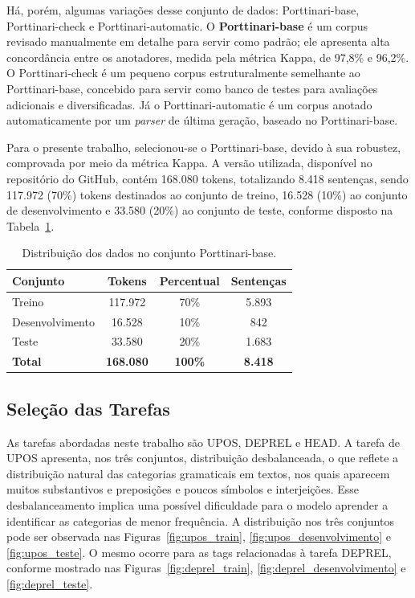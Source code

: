 Há, porém, algumas variações desse conjunto de dados: Porttinari-base, Porttinari-check e
Porttinari-automatic. O \textbf{Porttinari-base} é um corpus revisado manualmente em detalhe
para servir como padrão; ele apresenta alta concordância entre os anotadores, medida pela
métrica Kappa, de 97,8\% e 96,2\%. O Porttinari-check é um pequeno corpus estruturalmente
semelhante ao Porttinari-base, concebido para servir como banco de testes para avaliações
adicionais e diversificadas. Já o Porttinari-automatic é um corpus anotado automaticamente por
um \textit{parser} de última geração, baseado no Porttinari-base.

Para o presente trabalho, selecionou-se o Porttinari-base, devido à sua robustez, comprovada
por meio da métrica Kappa. A versão utilizada, disponível no repositório do GitHub, contém
168.080 tokens, totalizando 8.418 sentenças, sendo 117.972 (70\%) tokens destinados ao
conjunto de treino, 16.528 (10\%) ao conjunto de desenvolvimento e 33.580 (20\%) ao conjunto
de teste, conforme disposto na Tabela~\ref{tab:porttinari}.

\begin{table}[h!]
\centering
\caption{Distribuição dos dados no conjunto Porttinari-base.}
\label{tab:porttinari}
\begin{tabular}{lccc}
\hline
\textbf{Conjunto} & \textbf{Tokens} & \textbf{Percentual} & \textbf{Sentenças} \\ \hline
Treino            & 117.972         & 70\%                & 5.893 \\
Desenvolvimento   & 16.528          & 10\%                & 842   \\
Teste             & 33.580          & 20\%                & 1.683 \\ \hline
\textbf{Total}    & \textbf{168.080} & \textbf{100\%}     & \textbf{8.418} \\ \hline
\end{tabular}
\end{table}

\subsection*{Seleção das Tarefas}

As tarefas abordadas neste trabalho são UPOS, DEPREL e HEAD. A tarefa de UPOS apresenta, nos
três conjuntos, distribuição desbalanceada, o que reflete a distribuição natural das categorias
gramaticais em textos, nos quais aparecem muitos substantivos e preposições e poucos símbolos e
interjeições. Esse desbalanceamento implica uma possível dificuldade para o modelo aprender a
identificar as categorias de menor frequência. A distribuição nos três conjuntos pode ser
observada nas Figuras~\ref{fig:upos_train}, \ref{fig:upos_desenvolvimento} e
\ref{fig:upos_teste}. O mesmo ocorre para as tags relacionadas à tarefa DEPREL, conforme
mostrado nas Figuras~\ref{fig:deprel_train}, \ref{fig:deprel_desenvolvimento} e
\ref{fig:deprel_teste}.

